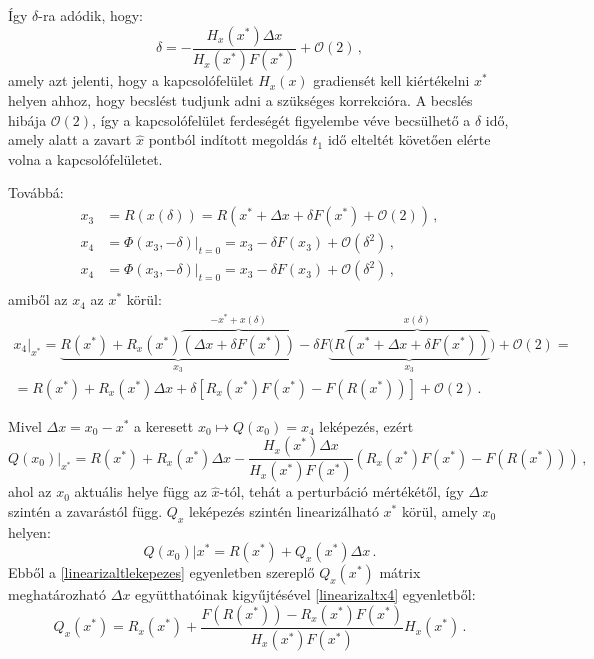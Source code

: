 Így $\delta$-ra adódik, hogy:
\begin{equation}
\delta=-\frac{H_x(x^*)\Delta x}{H_x(x^*)F(x^*)}+\mathcal{O}(2)\,,
\end{equation}
amely azt jelenti, hogy a kapcsolófelület $H_x(x)$ gradiensét kell kiértékelni $x^*$ helyen ahhoz, hogy becslést tudjunk adni a szükséges korrekcióra. A becslés hibája $\mathcal{O}(2)$, így a kapcsolófelület ferdeségét figyelembe véve becsülhető a $\delta$ idő, amely alatt a zavart $\hat x$ pontból indított megoldás $t_1$ idő elteltét követően elérte volna a kapcsolófelületet.\par
Továbbá:
\begin{align}
x_3&=R(x(\delta))=R(x^*+\Delta x+\delta F(x^*)+\mathcal{O}(2))\,, \\
x_4&=\Phi(x_3,-\delta)|_{t=0}=x_3-\delta F(x_3)+\mathcal{O}(\delta^2) \,,\\
x_4&=\Phi(x_3,-\delta)|_{t=0}=x_3-\delta F(x_3)+\mathcal{O}(\delta^2)\,, \\
\end{align}
amiből az $x_4$ az $x^*$ körül:
\begin{multline}
\left.x_4\right|_{x^*}=\underbrace{R(x^*)+R_x(x^*)\overbrace{(\Delta x+\delta F(x^*))}^{-x^*+x(\delta)}}_{x_3}-\delta F\underbrace{(R\overbrace{(x^*+\Delta x+\delta F(x^*))}^{x(\delta)}}_{x_3})+\mathcal{O}(2)=\\
=R(x^*)+R_x(x^*)\Delta x+ \delta [R_x(x^*)F(x^*)-F(R(x^*))]+\mathcal{O}(2)\,.
\end{multline}

Mivel $\Delta x=x_0-x^*$ a keresett $x_0 \mapsto Q(x_0)=x_4$ leképezés, ezért 
\begin{equation}
Q(x_0)|_{x^*}=R(x^*)+R_x(x^*)\Delta x-\frac{H_x(x^*)\Delta x}{H_x(x^*)F(x^*)}(R_x(x^*)F(x^*)-F(R(x^*)))\,,
\label{linearizaltx4}
\end{equation}
%
ahol az $x_0$ aktuális helye  függ az $\hat{ x}$-tól, tehát a perturbáció mértékétől, így $\Delta x$ szintén a zavarástól függ.
 $Q_x$ leképezés szintén linearizálható $x^*$ körül, amely $x_0$ helyen: 
\begin{equation}
Q(x_0)|{x^*}=R(x^*)+Q_x(x^*)\Delta x\,.
\label{linearizaltlekepezes}
\end{equation}
%
Ebből a \ref{linearizaltlekepezes} egyenletben szereplő $Q_x(x^*)$ mátrix meghatározható $\Delta x$ együtthatóinak kigyűjtésével \ref{linearizaltx4} egyenletből:
\begin{equation}
Q_x(x^*)=R_x(x^*)+\frac{F(R(x^*))-R_x(x^*)F(x^*)}{H_x(x^*)F(x^*)}H_x(x^*)\,.
\end{equation}

